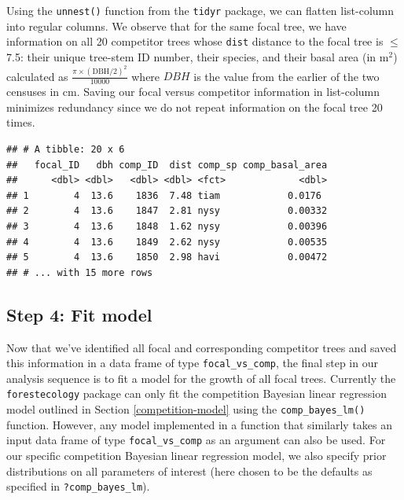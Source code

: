 \documentclass[12pt]{article}
\newenvironment{Shaded}{\begin{snugshade}}{\end{snugshade}}
\newcommand{\DataTypeTok}[1]{\textcolor[rgb]{0.13,0.29,0.53}{#1}}
\newcommand{\DecValTok}[1]{\textcolor[rgb]{0.00,0.00,0.81}{#1}}
\newcommand{\KeywordTok}[1]{\textcolor[rgb]{0.13,0.29,0.53}{\textbf{#1}}}
\newcommand{\NormalTok}[1]{#1}
\newcommand{\OperatorTok}[1]{\textcolor[rgb]{0.81,0.36,0.00}{\textbf{#1}}}
\newcommand{\StringTok}[1]{\textcolor[rgb]{0.31,0.60,0.02}{#1}}
\begin{document}
Using the \texttt{unnest()} function from the \texttt{tidyr} package, we
can flatten list-column into regular columns. We observe that for the
same focal tree, we have information on all 20 competitor trees whose
\texttt{dist} distance to the focal tree is \(\leq\) 7.5: their unique
tree-stem ID number, their species, and their basal area (in m\(^2\))
calculated as \(\frac{\pi \times (\text{DBH/2})^2}{10000}\) where
\(DBH\) is the value from the earlier of the two censuses in cm. Saving
our focal versus competitor information in list-column minimizes
redundancy since we do not repeat information on the focal tree 20
times.

\begin{Shaded}
\end{Shaded}

\begin{verbatim}
## # A tibble: 20 x 6
##   focal_ID   dbh comp_ID  dist comp_sp comp_basal_area
##      <dbl> <dbl>   <dbl> <dbl> <fct>             <dbl>
## 1        4  13.6    1836  7.48 tiam            0.0176 
## 2        4  13.6    1847  2.81 nysy            0.00332
## 3        4  13.6    1848  1.62 nysy            0.00396
## 4        4  13.6    1849  2.62 nysy            0.00535
## 5        4  13.6    1850  2.98 havi            0.00472
## # ... with 15 more rows
\end{verbatim}

\hypertarget{model-fit-predict}{%
\subsection{Step 4: Fit model}\label{model-fit-predict}}

Now that we've identified all focal and corresponding competitor trees
and saved this information in a data frame of type
\texttt{focal\_vs\_comp}, the final step in our analysis sequence is to
fit a model for the growth of all focal trees. Currently the
\texttt{forestecology} package can only fit the competition Bayesian
linear regression model outlined in Section \ref{competition-model}
using the \texttt{comp\_bayes\_lm()} function. However, any model
implemented in a function that similarly takes an input data frame of
type \texttt{focal\_vs\_comp} as an argument can also be used. For our
specific competition Bayesian linear regression model, we also specify
prior distributions on all parameters of interest (here chosen to be the
defaults as specified in \texttt{?comp\_bayes\_lm}).
\end{document}
